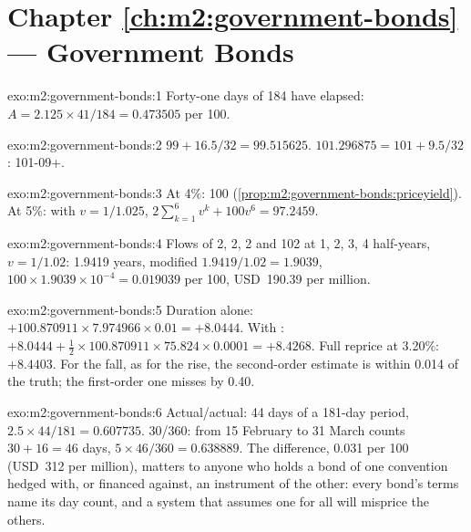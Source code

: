 \section*{Chapter \ref{ch:m2:government-bonds} --- Government Bonds}

\begin{solution}{exo:m2:government-bonds:1}
Forty-one days of 184 have elapsed: $A = 2.125 \times 41/184 = 0.473505$ per
100.
\end{solution}

\begin{solution}{exo:m2:government-bonds:2}
$99 + 16.5/32 = 99.515625$. $101.296875 = 101 + 9.5/32$: 101-09+.
\end{solution}

\begin{solution}{exo:m2:government-bonds:3}
At 4\%: 100 (\cref{prop:m2:government-bonds:priceyield}). At 5\%: with $v =
1/1.025$, $2\sum_{k=1}^{6} v^k + 100 v^6 = 97.2459$.
\end{solution}

\begin{solution}{exo:m2:government-bonds:4}
Flows of 2, 2, 2 and 102 at 1, 2, 3, 4 half-years, $v = 1/1.02$:  1.9419 years, modified $1.9419/1.02 = 1.9039$,  $100 \times
1.9039 \times 10^{-4} = 0.019039$ per 100, USD~190.39 per million.
\end{solution}

\begin{solution}{exo:m2:government-bonds:5}
Duration alone: $+100.870911 \times 7.974966 \times 0.01 = +8.0444$. With
: $+8.0444 + \frac12 \times 100.870911 \times 75.824 \times 0.0001 =
+8.4268$. Full reprice at 3.20\%: $+8.4403$. For the fall, as for the rise, the
second-order estimate is within 0.014 of the truth; the first-order one misses
by 0.40.
\end{solution}

\begin{solution}{exo:m2:government-bonds:6}
Actual/actual: 44 days of a 181-day period, $2.5 \times 44/181 = 0.607735$.
30/360: from 15 February to 31 March counts $30 + 16 = 46$ days, $5 \times 46/360
= 0.638889$. The difference, 0.031 per 100 (USD~312 per million), matters to
anyone who holds a bond of one convention hedged with, or financed against,
an instrument of the other: every bond's terms name its day count, and a
system that assumes one for all will misprice the others.
\end{solution}

